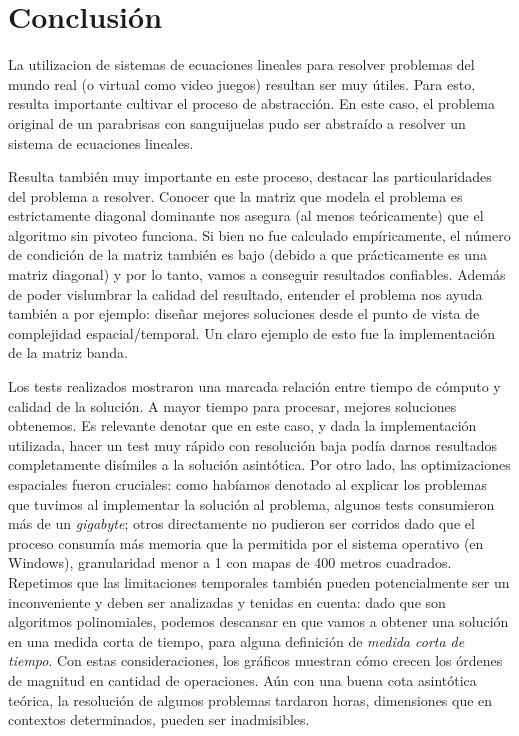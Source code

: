 	
	
\section{Conclusión}


	La utilizacion de sistemas de ecuaciones lineales para resolver problemas del mundo real (o virtual como video juegos) resultan ser muy útiles. Para esto, resulta importante cultivar el proceso de abstracción. En este caso, el problema original de un parabrisas con sanguijuelas pudo ser abstraído a resolver un sistema de ecuaciones lineales. 

	\par
	Resulta también muy importante en este proceso, destacar las particularidades del problema a resolver. Conocer que la matriz que modela el problema es estrictamente diagonal dominante nos asegura (al menos teóricamente) que el algoritmo sin pivoteo funciona. Si bien no fue calculado empíricamente, el número de condición de la matriz también es bajo (debido a que prácticamente es una matriz diagonal) y por lo tanto, vamos a conseguir resultados confiables. Además de poder vislumbrar la calidad del resultado, entender el problema nos ayuda también a por ejemplo: diseñar mejores soluciones desde el punto de vista de complejidad espacial/temporal. Un claro ejemplo de esto fue la implementación de la matriz banda.

	\par
	Los tests realizados mostraron una marcada relación entre tiempo de cómputo y calidad de la solución. A mayor tiempo para procesar, mejores soluciones obtenemos. Es relevante denotar que en este caso, y dada la implementación utilizada, hacer un test muy rápido con resolución baja podía darnos resultados completamente disímiles a la solución asintótica. Por otro lado, las optimizaciones espaciales fueron cruciales: como habíamos denotado al explicar los problemas que tuvimos al implementar la solución al problema, algunos tests consumieron más de un \textit{gigabyte}; otros directamente no pudieron ser corridos dado que el proceso consumía más memoria que la permitida por el sistema operativo (en Windows), granularidad menor a 1 con mapas de 400 metros cuadrados. Repetimos que las limitaciones temporales también pueden potencialmente ser un inconveniente y deben ser analizadas y tenidas en cuenta: dado que son algoritmos polinomiales, podemos descansar en que vamos a obtener una solución en una medida corta de tiempo, para alguna definición de \textit{medida corta de tiempo}. Con estas consideraciones, los gráficos muestran cómo crecen los órdenes de magnitud en cantidad de operaciones. Aún con una buena cota asintótica teórica, la resolución de algunos problemas tardaron horas, dimensiones que en contextos determinados, pueden ser inadmisibles.

